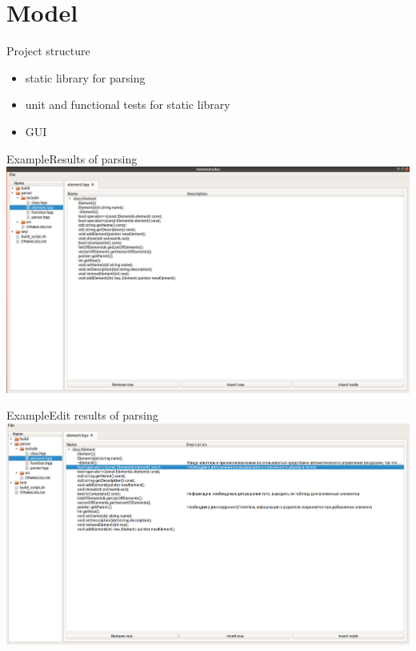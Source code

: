 \documentclass{beamer}
\begin{document}
\section{Model}
\begin{frame}
{Project structure}
\vskip 0.1cm

\begin{itemize}
\item{static library for parsing}
\item{unit and functional tests for static library}
\item{GUI}
\end{itemize}

\end{frame}

\begin{frame}
{Example}{Results of parsing}
\includegraphics[scale = 0.28]{semiautodoc-example.png}


\end{frame}

\begin{frame}
{Example}{Edit results of parsing}
\includegraphics[scale = 0.28]{edit.png}


\end{frame}
\end{document}

